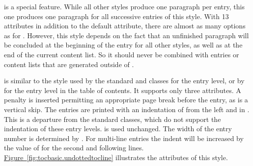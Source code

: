 \begin{description}
  is a special feature. While all other styles produce one paragraph per
  entry, this one produces one paragraph for all successive entries of this
  style. With 13
  attributes in addition to the default  attribute, there are
  almost as many options as for . However, this style
  depends on the fact that an unfinished paragraph will be concluded at the
  beginning of the entry for all other styles, as well as at the end of the
  current content list. So it should never be combined with entries or content
  lists that are generated outside of .
\item[\PValue{undottedtocline}] is similar to the style used by the standard
   and  classes for the  entry
  level, or by  for the  entry level in the
  table of contents. It supports only three attributes. A penalty is inserted permitting
  an appropriate page break before the entry, as is a vertical skip. The
  entries are printed with an indentation of  from the left and
  in . This is a departure from the standard classes, which do
  not support the indentation of these entry levels.
   is used unchanged. The width of the
  entry number is determined by . For multi-line entries the
  indent will be increased by the value of  for the second
  and following lines. \hyperref[fig:tocbasic.undottedtocline]%
  {Figure~\ref*{fig:tocbasic.undottedtocline}} illustrates the attributes of
  this style.
  \begin{figure}
    \centering
\end{figure}
\end{description}
